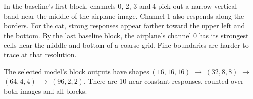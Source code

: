 In the baseline's first block, channels 0, 2, 3 and 4 pick out a narrow vertical band near the middle of the airplane image. Channel 1 also responds along the borders. For the cat, strong responses appear farther toward the upper left and the bottom. By the last baseline block, the airplane's channel 0 has its strongest cells near the middle and bottom of a coarse grid. Fine boundaries are harder to trace at that resolution.

The selected model's block outputs have shapes $(16,16,16)$ $\to$ $(32,8,8)$ $\to$ $(64,4,4)$ $\to$ $(96,2,2)$. There are 10 near-constant responses, counted over both images and all blocks.

